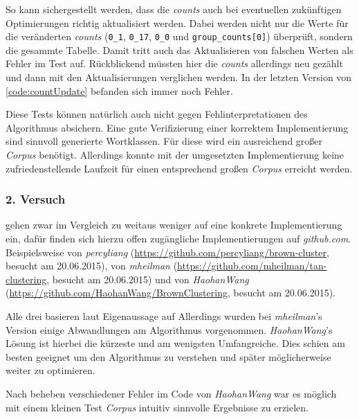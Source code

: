 		So kann sichergestellt werden, dass die \emph{counts} auch bei eventuellen zukünftigen Optimierungen richtig aktualisiert werden. Dabei werden nicht nur die Werte für die veränderten \emph{counts} (\texttt{0\_1}, \texttt{0\_17}, \texttt{0\_0} und \texttt{group\_counts[0]}) überprüft, sondern die gesammte Tabelle. Damit tritt auch das Aktualisieren von falschen Werten als Fehler im Test auf. Rückblickend müssten hier die \emph{counts} allerdings neu gezählt und dann mit den Aktualisierungen verglichen werden. In der letzten Version von \autoref{code:countUpdate} befanden sich immer noch Fehler.

		Diese Tests können natürlich auch nicht gegen Fehlinterpretationen des Algorithmus absichern. Eine gute Verifizierung einer korrektem Implementierung sind sinnvoll generierte Wortklassen. Für diese wird ein ausreichend großer \emph{Corpus} benötigt. Allerdings konnte mit der umgesetzten Implementierung keine zufriedenstellende Laufzeit für einen entsprechend großen \emph{Corpus} erreicht werden.

	\subsubsection*{2. Versuch}
        							
		\cite{cumpatationalLinguistics:classBasedNGramms} gehen zwar im Vergleich zu \cite{speechcommunication:exchange} weitaus weniger auf eine konkrete Implementierung ein, dafür finden sich hierzu offen zugängliche Implementierungen auf \emph{github.com}. Beispielsweise von \emph{percyliang} (\url{https://github.com/percyliang/brown-cluster}, besucht am 20.06.2015), von \emph{mheilman} (\url{https://github.com/mheilman/tan-clustering}, besucht am 20.06.2015) und von \emph{HaohanWang} (\url{https://github.com/HaohanWang/BrownClustering}, besucht am 20.06.2015).
            
		Alle drei basieren laut Eigenaussage auf \cite{cumpatationalLinguistics:classBasedNGramms} Allerdings wurden bei \emph{mheilman}'s Version einige Abwandlungen am Algorithmus vorgenommen. \emph{HaohanWang}'s Lösung ist hierbei die kürzeste und am wenigsten Umfangreiche. Dies schien am besten geeignet um den Algorithmus zu verstehen und später möglicherweise weiter zu optimieren. 
            
		Nach beheben verschiedener Fehler im Code von \emph{HaohanWang} war es möglich mit einem kleinen Test \emph{Corpus} intuitiv sinnvolle Ergebnisse zu erzielen.
            
